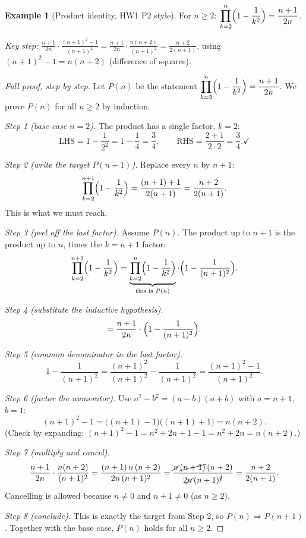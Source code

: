 \documentclass[11pt]{article}
\theoremstyle{definition}
\newtheorem{ex}[defn]{Example}
\begin{document}
\begin{ex}[Product identity, HW1 P2 style]
For $n\ge 2$: $\displaystyle\prod_{k=2}^{n}\Bigl(1-\frac1{k^2}\Bigr)=\frac{n+1}{2n}$.

\noindent\emph{Key step:}
$\frac{n+1}{2n}\cdot\frac{(n+1)^2-1}{(n+1)^2}
=\frac{n+1}{2n}\cdot\frac{n(n+2)}{(n+1)^2}=\frac{n+2}{2(n+1)}$, using
$(n+1)^2-1=n(n+2)$ (difference of squares).

\begin{proof}[Full proof, step by step]
Let $P(n)$ be the statement
$\displaystyle\prod_{k=2}^{n}\Bigl(1-\frac1{k^2}\Bigr)=\frac{n+1}{2n}$.
We prove $P(n)$ for all $n\ge2$ by induction.

\emph{Step 1 (base case $n=2$).} The product has a single factor,
$k=2$:
\[
\text{LHS}=1-\frac1{2^2}=1-\frac14=\frac34,\qquad
\text{RHS}=\frac{2+1}{2\cdot2}=\frac34. \checkmark
\]

\emph{Step 2 (write the target $P(n+1)$).} Replace every $n$ by $n+1$:
\[
\prod_{k=2}^{n+1}\Bigl(1-\frac1{k^2}\Bigr)=\frac{(n+1)+1}{2(n+1)}
=\frac{n+2}{2(n+1)}.
\]
This is what we must reach.

\emph{Step 3 (peel off the last factor).} Assume $P(n)$. The product up to
$n+1$ is the product up to $n$, times the $k=n+1$ factor:
\[
\prod_{k=2}^{n+1}\Bigl(1-\frac1{k^2}\Bigr)
=\underbrace{\prod_{k=2}^{n}\Bigl(1-\frac1{k^2}\Bigr)}_{\text{this is }P(n)}
\cdot\Bigl(1-\frac1{(n+1)^2}\Bigr).
\]

\emph{Step 4 (substitute the inductive hypothesis).}
\[
=\frac{n+1}{2n}\cdot\Bigl(1-\frac1{(n+1)^2}\Bigr).
\]

\emph{Step 5 (common denominator in the last factor).}
\[
1-\frac1{(n+1)^2}=\frac{(n+1)^2}{(n+1)^2}-\frac1{(n+1)^2}
=\frac{(n+1)^2-1}{(n+1)^2}.
\]

\emph{Step 6 (factor the numerator).} Use $a^2-b^2=(a-b)(a+b)$ with
$a=n+1$, $b=1$:
\[
(n+1)^2-1=\bigl((n+1)-1\bigr)\bigl((n+1)+1\bigr)=n(n+2).
\]
(Check by expanding: $(n+1)^2-1=n^2+2n+1-1=n^2+2n=n(n+2)$.)

\emph{Step 7 (multiply and cancel).}
\[
\frac{n+1}{2n}\cdot\frac{n(n+2)}{(n+1)^2}
=\frac{(n+1)\,n\,(n+2)}{2n\,(n+1)^2}
=\frac{\cancel{n}\,\cancel{(n+1)}\,(n+2)}{2\cancel{n}\,(n+1)^{\cancel{2}}}
=\frac{n+2}{2(n+1)}.
\]
Cancelling is allowed because $n\ne0$ and $n+1\ne0$ (as $n\ge2$).

\emph{Step 8 (conclude).} This is exactly the target from Step 2, so
$P(n)\Rightarrow P(n+1)$. Together with the base case, $P(n)$ holds for
all $n\ge2$.
\end{proof}


\end{ex}
\end{document}
